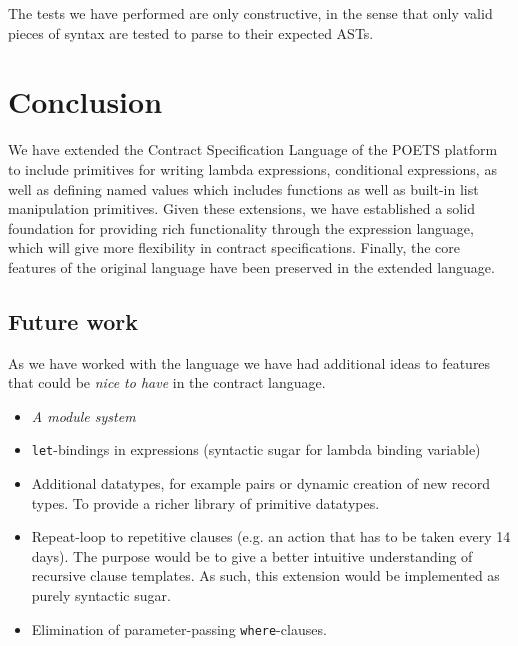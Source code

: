 \documentclass[10pt,a4paper,final,oneside,openany,article]{memoir}
\begin{document}
The tests we have performed are only constructive, in the sense that
only valid pieces of syntax are tested to parse to their expected
ASTs.

\chapter{Conclusion}
We have extended the Contract Specification Language of the POETS
platform to include primitives for writing lambda expressions,
conditional expressions, as well as defining named values which includes
functions as well as built-in list manipulation primitives. Given these
extensions, we have established a solid foundation for providing rich
functionality through the expression language, which will give more
flexibility in contract specifications.
Finally, the core features of the original language \cite[page
4]{hvitved10} have been preserved in the extended language.


\section{Future work}
As we have worked with the language we have had additional ideas to
features that could be \textit{nice to have} in the contract language.

\begin{itemize}
\item \textit{A module system}
\item \lstinline{let}-bindings in expressions (syntactic sugar for
  lambda binding variable)
\item Additional datatypes, for example pairs or dynamic creation of
  new record types. To provide a richer library of primitive
  datatypes.
\item Repeat-loop to repetitive clauses (e.g. an action that has to be
  taken every 14 days). The purpose would be to give a better
  intuitive understanding of recursive clause templates. As such, this
  extension would be implemented as purely syntactic sugar.
\item Elimination of parameter-passing \lstinline{where}-clauses.
\end{itemize}

\printbibliography
\end{document}
